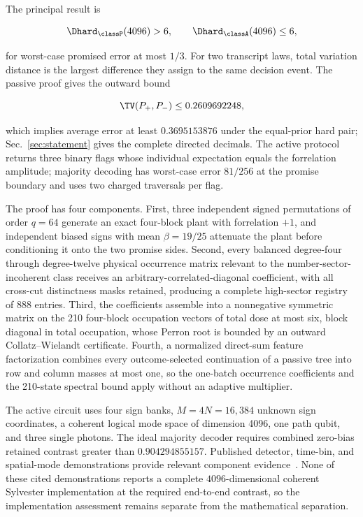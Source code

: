 The principal result is

\begin{equation}
\Dhard_{\classP}(4096)>6,
\qquad
\Dhard_{\classA}(4096)\le 6,
\label{eq:intro-separation}
\end{equation}

for worst-case promised error at most $1/3$. For two transcript laws, total variation distance is the largest difference they assign to the same decision event. The passive proof gives the outward bound

\begin{equation}
\TV(P_+,P_-)
\le 0.2609692248,
\label{eq:intro-tv}
\end{equation}

which implies average error at least $0.3695153876$ under the equal-prior hard pair; Sec.~\ref{sec:statement} gives the complete directed decimals. The active protocol returns three binary flags whose individual expectation equals the forrelation amplitude; majority decoding has worst-case error $81/256$ at the promise boundary and uses two charged traversals per flag.

The proof has four components. First, three independent signed permutations of order $q=64$ generate an exact four-block plant with forrelation $+1$, and independent biased signs with mean $\beta=19/25$ attenuate the plant before conditioning it onto the two promise sides. Second, every balanced degree-four through degree-twelve physical occurrence matrix relevant to the number-sector-incoherent class receives an arbitrary-correlated-diagonal coefficient, with all cross-cut distinctness masks retained, producing a complete high-sector registry of 888 entries. Third, the coefficients assemble into a nonnegative symmetric matrix on the 210 four-block occupation vectors of total dose at most six, block diagonal in total occupation, whose Perron root is bounded by an outward Collatz--Wielandt certificate. Fourth, a normalized direct-sum feature factorization combines every outcome-selected continuation of a passive tree into row and column masses at most one, so the one-batch occurrence coefficients and the 210-state spectral bound apply without an adaptive multiplier.

The active circuit uses four sign banks, $M=4N=16{,}384$ unknown sign coordinates, a coherent logical mode space of dimension 4096, one path qubit, and three single photons. The ideal majority decoder requires combined zero-bias retained contrast greater than $0.904294855157$. Published detector, time-bin, and spatial-mode demonstrations provide relevant component evidence~\cite{ReddyEtAl2020,BouchardEtAl2024,MadsenEtAl2022,GoelEtAl2024}. None of these cited demonstrations reports a complete $4096$-dimensional coherent Sylvester implementation at the required end-to-end contrast, so the implementation assessment remains separate from the mathematical separation.

